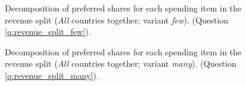 \begin{figure}[h!]
    \caption[Decomposition of preferred spendings in revenue split]{Decomposition of preferred shares for each spending item in the revenue split (\textit{All} countries together; variant \textit{few}). (Question \ref{q:revenue_split_few}).
    }\label{fig:split_few}
\end{figure}

\begin{figure}[h!]
    \caption[Decomposition of preferred spendings in revenue split]{Decomposition of preferred shares for each spending item in the revenue split (\textit{All} countries together; variant \textit{many}). (Question \ref{q:revenue_split_many}).
    }\label{fig:split_many}
\end{figure}

